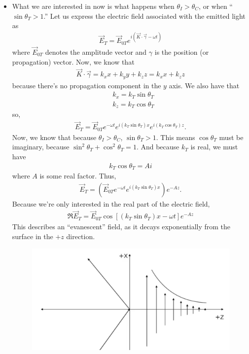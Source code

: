 \documentclass{book}
\theoremstyle{definition}
\newcommand{\lp}{\left(}
\newcommand{\rp}{\right)}
\newcommand{\lb}{\left[}
\newcommand{\rb}{\right]}
\begin{document}
\begin{itemize}
\begin{itemize}
		\item What we are interested in now is what happens when $\theta_I > \theta_C$, or when ``$\sin\theta_T > 1$.'' Let us express the electric field associated with the emitted light as
		\begin{align}
		\vec{E}_T = \vec{E}_{0T}e^{i(\vec{K}\cdot\vec{\gamma} - \omega t)}
		\end{align}
		where $\vec{E}_{0T}$ denotes the amplitude vector and $\gamma$ is the position (or propagation) vector. Now, we know that
		\begin{align}
		\vec{K}\cdot\vec{\gamma} = k_x x + k_y y + k_z z = k_x x + k_z z 
		\end{align}
		because there's no propagation component in the $y$ axis. We also have that
		\begin{align}
		&k_x = k_T \sin\theta_T\\
		&k_z = k_T \cos\theta_T
		\end{align}
		so,
		\begin{align}
		\vec{E}_T = \vec{E}_{0T}e^{-\omega t}e^{i(k_T\sin\theta_T)x}e^{i(k_T\cos\theta_T)z}.
		\end{align}
		Now, we know that because $\theta_I > \theta_C$, $\sin\theta_T > 1$. This means $\cos\theta_T$ must be imaginary, because $\sin^2\theta_T + \cos^2\theta_T = 1$. And because $k_T$ is real, we must have
		\begin{align}
		k_T\cos\theta_T = Ai
		\end{align}
		where $A$ is some real factor. Thus,
		\begin{align}
		\vec{E}_T = \lp\vec{E}_{0T}e^{-\omega t}e^{i(k_T\sin\theta_T)x}\rp e^{-Az}.
		\end{align}
		Because we're only interested in the real part of the electric field, 
		\begin{align}
		\boxed{\Re{\vec{E}_{T}} = \vec{E}_{0T}\cos\lb (k_T\sin\theta_T)x - \omega t \rb e^{-Az}}
		\end{align}
		This describes an ``evanescent'' field, as it decays exponentially from the surface in the $+z$ direction. 
		\begin{figure}[!htb]
			\centering
			\includegraphics[scale=0.5]{evanes}
		\end{figure}
	

\end{itemize}
\end{itemize}
\end{document}
